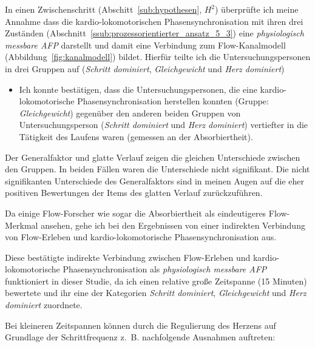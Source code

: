 In einen Zwischenschritt (Abschitt~\ref{sub:hypothesen}, $H^2$) überprüfte ich meine Annahme dass die kardio-lokomotorischen Phasensynchronisation mit ihren drei Zuständen (Abschnitt~\ref{ssub:prozessorientierter_ansatz_5_3}) eine \emph{physiologisch messbare \ac{AFP}} darstellt und damit eine Verbindung zum Flow-Kanalmodell (Abbildung~\ref{fig:kanalmodell}) bildet. Hierfür teilte ich die Untersuchungspersonen in drei Gruppen auf (\emph{Schritt dominiert}, \emph{Gleichgewicht} und \emph{Herz dominiert})

\begin{itemize}

	\item Ich konnte bestätigen, dass die Untersuchungspersonen, die eine kardio-lokomotorische Phasensynchronisation herstellen konnten (Gruppe: \emph{Gleichgewicht}) gegenüber den anderen beiden Gruppen von Untersuchungsperson (\emph{Schritt dominiert} und \emph{Herz dominiert}) vertiefter in die Tätigkeit des  Laufens waren (gemessen an der Absorbiertheit).

\end{itemize}


Der Generalfaktor und glatte Verlauf zeigen die gleichen Unterschiede zwischen den Gruppen. In beiden Fällen waren die Unterschiede nicht signifikant. Die nicht signifikanten Unterschiede des Generalfaktors sind in meinen Augen auf die eher positiven Bewertungen der Items des glatten Verlauf zurückzuführen. 

Da einige Flow-Forscher wie \cite{Peifer2014} sogar die Absorbiertheit als eindeutigeres Flow-Merkmal ansehen, gehe ich bei den Ergebnissen von einer indirekten Verbindung von Flow-Erleben und kardio-lokomotorische Phasensynchronisation aus. 

Diese bestätigte indirekte Verbindung zwischen Flow-Erleben und kardio-lokomotorische Phasensynchronisation als \emph{physiologisch messbare \ac{AFP}} funktioniert in dieser Studie, da ich einen relative große Zeitspanne (15 Minuten) bewertete und ihr eine der Kategorien \emph{Schritt dominiert}, \emph{Gleichgewicht} und \emph{Herz dominiert} zuordnete.

Bei kleineren Zeitspannen können durch die Regulierung des Herzens auf Grundlage der Schrittfrequenz z.~B. nachfolgende Ausnahmen auftreten: 

